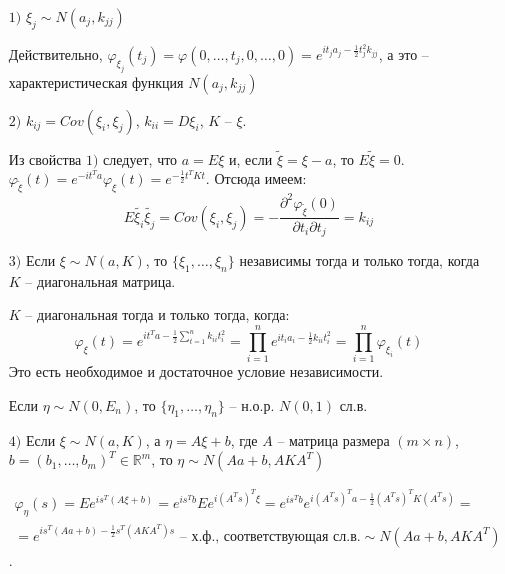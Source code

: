 \begin{itemize} 
  \item[$1)$] 
    $ \xi_j \sim N(a_j, k_{jj}) $
    \begin{Proof}
    	Действительно, $\displaystyle \varphi_{\xi_j}(t_j) = \varphi(0, \ldots, t_j, 0, \ldots, 0) = e^{it_ja_j-\frac{1}{2}t_j^2k_{jj}} $, а это -- характеристическая функция $ N(a_j, k_{jj}) $ 
    \end{Proof}
  \item[$2)$]
    $ k_{ij} = Cov(\xi_i, \xi_j)$, $ k_{ii} = D\xi_i $, $ K $ --  $ \xi $.
    \begin{Proof}
      Из свойства $1)$ следует, что $ a = E\xi $ и, если $ \tilde{\xi} = \xi - a $, то $ E\tilde{\xi} = 0 $. $ \displaystyle \varphi_{\tilde{\xi}}(t) = e^{-it^Ta}\varphi_{\xi}(t) = e^{-\frac{1}{2}t^TKt} $. Отсюда имеем:
      $$ \displaystyle E\tilde{\xi_i}\tilde{\xi_j} = Cov(\xi_i, \xi_j) = - \dfrac{\partial^2\varphi_{\tilde{\xi}}(0)}{\partial t_i\partial t_j} = k_{ij} $$
    \end{Proof}
  \item[$3)$] 
    Если $ \xi \sim N(a,K) $, то $ \lbrace \xi_1, \ldots, \xi_n \rbrace $ независимы тогда и только тогда, когда $ K $ -- диагональная матрица.
    \begin{Proof}
      $ K $ -- диагональная тогда и только тогда, когда: 
      $$ \varphi_{\xi}(t) = e^{it^Ta - \frac{1}{2} \sum\limits_{t = 1}^n k_{ii}t_i^2} = \prod\limits_{i = 1}^n e^{it_ia_i - \frac{1}{2}k_{ii}t_i^2} = \prod\limits_{i = 1}^n \varphi_{\xi_i}(t)$$ 
      Это есть необходимое и достаточное условие независимости.
    \end{Proof}
    \begin{conseq}
      Если $ \eta \sim N(0, E_n) $, то $ \lbrace \eta_1, \ldots, \eta_n \rbrace $ -- н.о.р. $ N(0, 1)$ сл.в.
    \end{conseq}
  \item[$4)$] 
    Если $ \xi \sim N(a, K) $, а $ \eta = A\xi + b $, где $ A $ -- матрица размера $ (m\times n) $, $ b = (b_1, \ldots, b_m)^T \in \mathbb{R}^m$, то $ \eta \sim N(Aa + b, AKA^T) $
    \begin{Proof}
      $$ \begin{gathered} 
        \varphi_{\eta}(s)=Ee^{is^T(A\xi + b)}=e^{is^Tb}Ee^{i(A^Ts)^T\xi} = e^{is^Tb}e^{i(A^Ts)^Ta - \frac{1}{2}(A^Ts)^TK(A^Ts)}= \\ 
        = e^{is^T(Aa + b) - \frac{1}{2}s^T(AKA^T)s}\text{ -- х.ф., соответствующая сл.в.} \sim  N(Aa + b, AKA^T) \end{gathered}$$.
    \end{Proof}


\end{itemize}
